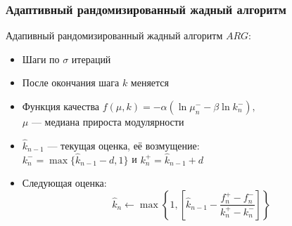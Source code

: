 \begin{frame}
	\frametitle{Адаптивный рандомизированный жадный алгоритм}

	Адапивный рандомизированный жадный алгоритм $ARG$:
	\begin{itemize}
		\item Шаги по $\sigma$ итераций
		\item После окончания шага $k$ меняется
		\item Функция качества $f(\mu, k) = -\alpha (\ln \mu_n^{-} - \beta \ln k_n^{-}),$\\ $\mu$ --- медиана прироста модулярности
		\item $\hat{k}_{n - 1}$ --- текущая оценка, её возмущение:\\
		$k_{n}^{-} = \max\{\hat{k}_{n - 1} - d, 1\}$ и $k_{n}^{+} = \hat{k}_{n - 1} + d$
		\item Следующая оценка:
		$$\hat{k}_n \leftarrow \max\left\{1, \left[\hat{k}_{n - 1} - \frac{f_n^{+} - f_n^{-}}{k_n^{+} - k_n^{-}}\right]\right\}$$
	\end{itemize}
\end{frame}


